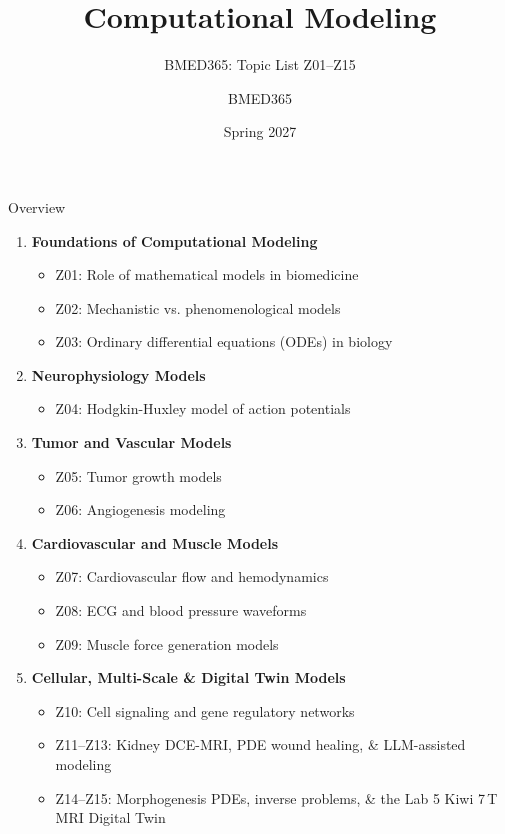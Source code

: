 \documentclass[aspectratio=169, 10pt]{beamer}
\title{Computational Modeling}
\subtitle{BMED365: Topic List Z01--Z15}
\author{BMED365}
\date{Spring 2027}
\begin{document}
\begin{frame}
    \titlepage
\end{frame}

\begin{frame}{Overview}
    \begin{enumerate}
        \item \textbf{Foundations of Computational Modeling}
        \begin{itemize}
            \item Z01: Role of mathematical models in biomedicine
            \item Z02: Mechanistic vs. phenomenological models
            \item Z03: Ordinary differential equations (ODEs) in biology
        \end{itemize}
        \item \textbf{Neurophysiology Models}
        \begin{itemize}
            \item Z04: Hodgkin-Huxley model of action potentials
        \end{itemize}
        \item \textbf{Tumor and Vascular Models}
        \begin{itemize}
            \item Z05: Tumor growth models
            \item Z06: Angiogenesis modeling
        \end{itemize}
        \item \textbf{Cardiovascular and Muscle Models}
        \begin{itemize}
            \item Z07: Cardiovascular flow and hemodynamics
            \item Z08: ECG and blood pressure waveforms
            \item Z09: Muscle force generation models
        \end{itemize}
        \item \textbf{Cellular, Multi-Scale \& Digital Twin Models}
        \begin{itemize}
            \item Z10: Cell signaling and gene regulatory networks
            \item Z11--Z13: Kidney DCE-MRI, PDE wound healing, \& LLM-assisted modeling
            \item Z14--Z15: Morphogenesis PDEs, inverse problems, \& the Lab 5 Kiwi 7\,T MRI Digital Twin
        \end{itemize}
    \end{enumerate}
\end{frame}
\end{document}

